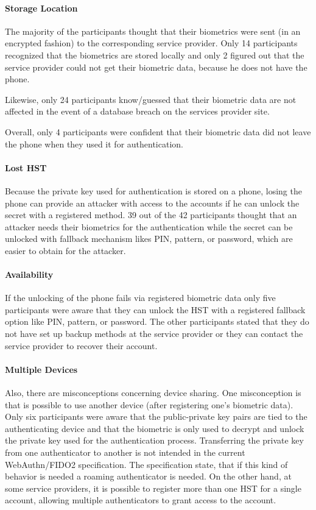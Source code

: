 \documentclass[runningheads]{llncs}
\begin{document}
\paragraph{Storage Location}
The majority of the participants thought that their biometrics were sent (in an encrypted fashion) to the corresponding service provider. Only 14 participants recognized that the biometrics are stored locally and only 2 figured out that the service provider could not get their biometric data, because he does not have the phone.

Likewise, only 24 participants know/guessed that their biometric data are not affected in the event of a database breach on the services provider site.

Overall, only 4 participants were confident that their biometric data did not leave the phone when they used it for authentication.

\paragraph{Lost HST}
Because the private key used for authentication is stored on a phone, losing the phone can provide an attacker with access to the accounts if he can unlock the secret with a registered method. 39 out of the 42 participants thought that an attacker needs their biometrics for the authentication while the secret can be unlocked with fallback mechanism likes PIN, pattern, or password, which are easier to obtain for the attacker.

\paragraph{Availability}
If the unlocking of the phone fails via registered biometric data only five participants were aware that they can unlock the HST with a registered fallback option like PIN, pattern, or password. The other participants stated that they do not have set up backup methods at the service provider or they can contact the service provider to recover their account.

\paragraph{Multiple Devices}
Also, there are misconceptions concerning device sharing. One misconception is that is possible to use another device (after registering one's biometric data). Only six participants were aware that the public-private key pairs are tied to the authenticating device and that the biometric is only used to decrypt and unlock the private key used for the authentication process. Transferring the private key from one authenticator to another is not intended in the current WebAuthn/FIDO2 specification. The specification state, that if this kind of behavior is needed a roaming authenticator is needed. On the other hand, at some service providers, it is possible to register more than one HST for a single account, allowing multiple authenticators to grant access to the account.
\end{document}
